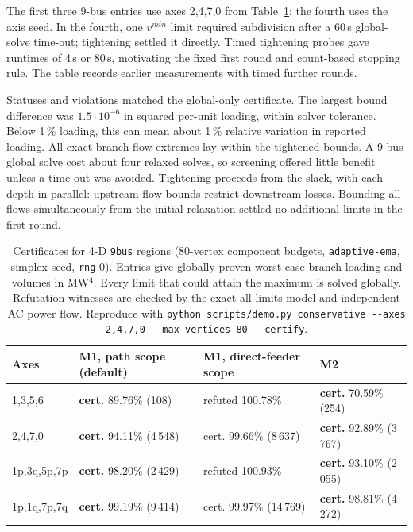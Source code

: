 \documentclass[11pt,a4paper]{report}
\newcommand{\code}[1]{\texttt{\small #1}}
\begin{document}
\noindent The first three 9-bus entries use axes 2,4,7,0 from
Table~\ref{tab:certificate}; the fourth uses the axis seed. In the fourth,
one $v^{min}$ limit required subdivision after a 60\,s global-solve time-out;
tightening settled it directly. Timed tightening probes gave runtimes of
4\,s or 80\,s, motivating the fixed first round and count-based stopping
rule. The table records earlier measurements with timed further rounds.

Statuses and violations matched the global-only certificate. The largest
bound difference was $1.5\cdot10^{-6}$ in squared per-unit loading, within
solver tolerance. Below 1\,\% loading, this can mean about 1\,\% relative
variation in reported loading. All exact branch-flow extremes lay within the
tightened bounds. A 9-bus global solve cost about four relaxed solves, so
screening offered little benefit unless a time-out was avoided. Tightening proceeds from the slack, with each depth
in parallel: upstream flow bounds restrict downstream losses. Bounding all
flows simultaneously from the initial relaxation settled no additional limits
in the first round.

\begin{table}[h]
\centering\small
\caption{Certificates for 4-D \code{9bus} regions (80-vertex component
budgets, \code{adaptive-ema}, simplex seed, \code{rng} 0).
Entries give globally proven worst-case branch loading and volumes in MW$^4$.
Every limit that could attain the maximum is solved globally.
Refutation witnesses are checked by the exact all-limits model and independent
AC power flow. Reproduce with
\code{python scripts/demo.py conservative -{}-axes 2,4,7,0 -{}-max-vertices 80
-{}-certify}.}
\label{tab:certificate}
\begin{tabular}{@{}llll@{}}
\toprule
Axes & M1, path scope (default) & M1, direct-feeder scope & M2 \\
\midrule
1,3,5,6     & \textbf{cert.} 89.76\% (108) & refuted 100.78\% & \textbf{cert.} 70.59\% (254) \\
2,4,7,0     & \textbf{cert.} 94.11\% (4\,548) & cert. 99.66\% (8\,637) & \textbf{cert.} 92.89\% (3\,767) \\
1p,3q,5p,7p & \textbf{cert.} 98.20\% (2\,429) & refuted 100.93\% & \textbf{cert.} 93.10\% (2\,055) \\
1p,1q,7p,7q & \textbf{cert.} 99.19\% (9\,414) & cert. 99.97\% (14\,769) & \textbf{cert.} 98.81\% (4\,272) \\
\bottomrule
\end{tabular}
\end{table}
\end{document}
